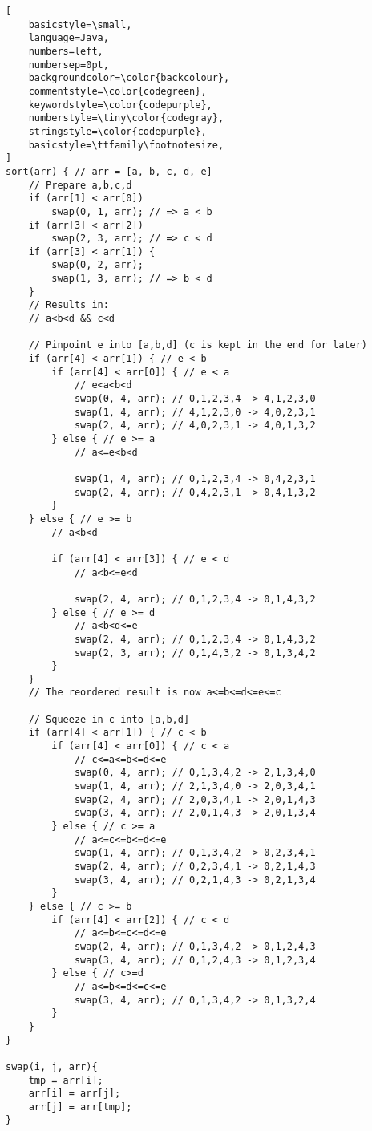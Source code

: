 \documentclass[ngerman,landscape,twocolumn]{adtexsheet}
\begin{document}
\begin{lstlisting}[
    basicstyle=\small,
    language=Java,
    numbers=left,                    
    numbersep=0pt,
    backgroundcolor=\color{backcolour},   
    commentstyle=\color{codegreen},
    keywordstyle=\color{codepurple},
    numberstyle=\tiny\color{codegray},
    stringstyle=\color{codepurple},
    basicstyle=\ttfamily\footnotesize,
]
sort(arr) { // arr = [a, b, c, d, e]
    // Prepare a,b,c,d
    if (arr[1] < arr[0])
        swap(0, 1, arr); // => a < b
    if (arr[3] < arr[2])
        swap(2, 3, arr); // => c < d
    if (arr[3] < arr[1]) {
        swap(0, 2, arr);
        swap(1, 3, arr); // => b < d
    } 
    // Results in:
    // a<b<d && c<d

    // Pinpoint e into [a,b,d] (c is kept in the end for later)
    if (arr[4] < arr[1]) { // e < b
        if (arr[4] < arr[0]) { // e < a
            // e<a<b<d
            swap(0, 4, arr); // 0,1,2,3,4 -> 4,1,2,3,0
            swap(1, 4, arr); // 4,1,2,3,0 -> 4,0,2,3,1
            swap(2, 4, arr); // 4,0,2,3,1 -> 4,0,1,3,2
        } else { // e >= a
            // a<=e<b<d
            
            swap(1, 4, arr); // 0,1,2,3,4 -> 0,4,2,3,1
            swap(2, 4, arr); // 0,4,2,3,1 -> 0,4,1,3,2
        }
    } else { // e >= b
        // a<b<d

        if (arr[4] < arr[3]) { // e < d
            // a<b<=e<d

            swap(2, 4, arr); // 0,1,2,3,4 -> 0,1,4,3,2
        } else { // e >= d
            // a<b<d<=e
            swap(2, 4, arr); // 0,1,2,3,4 -> 0,1,4,3,2
            swap(2, 3, arr); // 0,1,4,3,2 -> 0,1,3,4,2
        }
    }
    // The reordered result is now a<=b<=d<=e<=c

    // Squeeze in c into [a,b,d]
    if (arr[4] < arr[1]) { // c < b
        if (arr[4] < arr[0]) { // c < a
            // c<=a<=b<=d<=e 
            swap(0, 4, arr); // 0,1,3,4,2 -> 2,1,3,4,0
            swap(1, 4, arr); // 2,1,3,4,0 -> 2,0,3,4,1
            swap(2, 4, arr); // 2,0,3,4,1 -> 2,0,1,4,3
            swap(3, 4, arr); // 2,0,1,4,3 -> 2,0,1,3,4
        } else { // c >= a
            // a<=c<=b<=d<=e 
            swap(1, 4, arr); // 0,1,3,4,2 -> 0,2,3,4,1
            swap(2, 4, arr); // 0,2,3,4,1 -> 0,2,1,4,3
            swap(3, 4, arr); // 0,2,1,4,3 -> 0,2,1,3,4
        }
    } else { // c >= b
        if (arr[4] < arr[2]) { // c < d
            // a<=b<=c<=d<=e 
            swap(2, 4, arr); // 0,1,3,4,2 -> 0,1,2,4,3
            swap(3, 4, arr); // 0,1,2,4,3 -> 0,1,2,3,4
        } else { // c>=d
            // a<=b<=d<=c<=e 
            swap(3, 4, arr); // 0,1,3,4,2 -> 0,1,3,2,4
        }
    }
}

swap(i, j, arr){
    tmp = arr[i];
    arr[i] = arr[j];
    arr[j] = arr[tmp];
}
\end{lstlisting}
\end{document}
